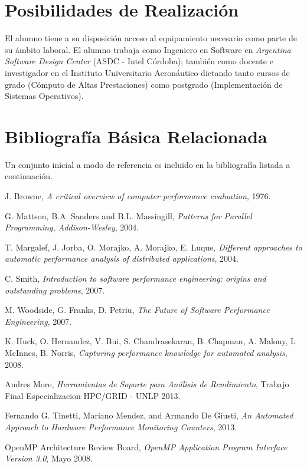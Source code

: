 \documentclass[a4paper]{article}
\begin{document}
\section{Posibilidades de Realización}

El alumno tiene a su disposición acceso al equipamiento necesario como parte de su ámbito laboral.
El alumno trabaja como Ingeniero en Software en {\it Argentina Software Design Center} (ASDC - Intel Córdoba); también
como docente e investigador en el Instituto Universitario Aeronáutico dictando tanto cursos de grado (Cómputo de Altas Prestaciones) como postgrado (Implementación de Sistemas Operativos).

\section{Bibliografía Básica Relacionada}

Un conjunto inicial a modo de referencia es incluido en la bibliografía listada a continuación.

\begin{thebibliography}{9}
  
 J. Browne,
 \emph{A critical overview of computer performance evaluation},
 1976.

 G. Mattson, B.A. Sanders and B.L. Massingill, 
 \emph{Patterns for Parallel Programming, Addison-Wesley},
 2004.

 T. Margalef, J. Jorba, O. Morajko, A. Morajko, E. Luque,
 \emph{Different approaches to automatic performance analysis of distributed applications},
 2004.

 C. Smith,
 \emph{Introduction to software performance engineering: origins and outstanding problems},
 2007.

 M. Woodside, G. Franks, D. Petriu,
 \emph{The Future of Software Performance Engineering},
 2007.

 K. Huck, O. Hernandez, V. Bui, S. Chandrasekaran, B. Chapman, A. Malony, L McInnes, B. Norris,
 \emph{Capturing performance knowledge for automated analysis},
 2008.

  Andres More,
 \emph{Herramientas de Soporte para Análisis de Rendimiento},
 Trabajo Final Especializacion HPC/GRID - UNLP 2013.

  Fernando G. Tinetti, Mariano Mendez, and Armando De Giusti,
  \emph{An Automated Approach to Hardware Performance Monitoring Counters},
  2013. 

  OpenMP Architecture Review Board,
  \emph{OpenMP Application Program Interface Version 3.0},
  Mayo 2008.

\end{thebibliography}
\end{document}
